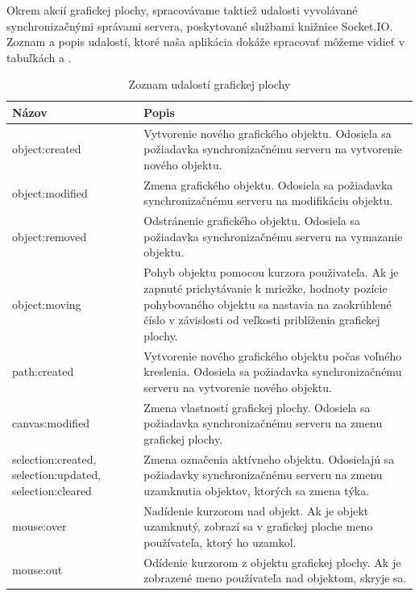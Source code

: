 Okrem akcií grafickej plochy, spracovávame taktiež udalosti vyvolávané synchronizačnými správami servera, poskytované službami knižnice Socket.IO. Zoznam a popis udalostí, ktoré naša aplikácia dokáže spracovať môžeme vidieť v tabuľkách  a .

\begin{table}
	\begin{tabular}{ | m{4cm} | m{8.5cm} | } \hline
		\textbf{Názov} & \textbf{Popis} \\ \hline \hline
		
		object:created & Vytvorenie nového grafického objektu. Odosiela sa požiadavka synchronizačnému serveru na vytvorenie nového objektu. \\\hline
		object:modified & Zmena grafického objektu. Odosiela sa požiadavka synchronizačnému serveru na modifikáciu objektu. \\\hline
		object:removed & Odstránenie grafického objektu. Odosiela sa požiadavka synchronizačnému serveru na vymazanie objektu.  \\\hline
		object:moving & Pohyb objektu pomocou kurzora použivateľa. Ak je zapnuté prichytávanie k mriežke, hodnoty pozície pohybovaného objektu sa nastavia na zaokrúhlené číslo v závislosti od veľkosti priblíženia grafickej plochy.  \\\hline
		path:created & Vytvorenie nového grafického objektu počas voľného kreslenia. Odosiela sa požiadavka synchronizačnému serveru na vytvorenie nového objektu. \\\hline
		canvas:modified & Zmena vlastností grafickej plochy. Odosiela sa požiadavka synchronizačnému serveru na zmenu grafickej plochy. \\\hline
		selection:created, selection:updated, selection:cleared & Zmena označenia aktívneho objektu. Odosielajú sa požiadavky synchronizačnému serveru na zmenu uzamknutia objektov, ktorých sa zmena týka. \\\hline
		mouse:over & Nadídenie kurzorom nad objekt. Ak je objekt uzamknutý, zobrazí sa v grafickej ploche meno používateľa, ktorý ho uzamkol. \\\hline
		mouse:out & Odídenie kurzorom z objektu grafickej plochy. Ak je zobrazené meno používateľa nad objektom, skryje sa. \\\hline
		
		\hline
	\end{tabular}
	\caption{Zoznam udalostí grafickej plochy}
	\label{tab:editor-events}
\end{table}

